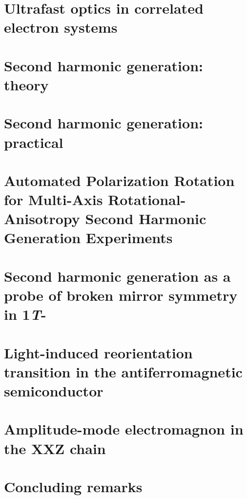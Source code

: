 \documentclass[
    letterpaper,
    12pt,
    openbib,
]{memoir}
\begin{document}
\frontmatter*


\acknowledgements

\clearpage
\preface

\clearpage

\tableofcontents
\clearpage
\listoffigures
\clearpage
\listoftables
\clearpage

\mainmatter*
\chapter{Ultrafast optics in correlated electron systems\label{ch:intro}}

\chapter{Second harmonic generation: theory\label{ch:shgtheory}}

\chapter{Second harmonic generation: practical}\label{ch:shgpractice}

\chapter{Automated Polarization Rotation for Multi-Axis Rotational-Anisotropy Second Harmonic Generation Experiments}\label{ch:polrotators}

\chapter{Second harmonic generation as a probe of broken mirror symmetry in 1\textit{T}-}\label{ch:tastwo}
\chapter{Light-induced reorientation transition in the antiferromagnetic semiconductor }\label{ch:cmb}
\chapter{Amplitude-mode electromagnon in the XXZ chain }\label{ch:cubr2}
\chapter{Concluding remarks}\label{ch:conclusion}

\backmatter*

\end{document}
